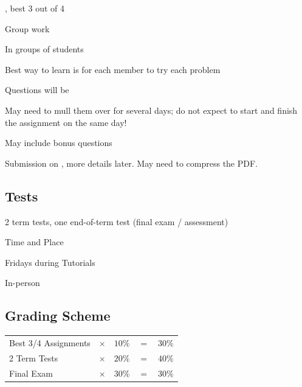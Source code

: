 \begin{listu}
    \item {}, best 3 out of 4
    \item Group work
    \begin{listu}
        \item In groups of  students
        \item Best way to learn is for each member to try each problem
    \end{listu}
    \item Questions will be 
    \begin{listu}
        \item May need to mull them over for several days; do not expect to start and finish the assignment on the same day!
        \item May include bonus questions
    \end{listu}
    \item Submission on , more details later. May need to compress the PDF. 
\end{listu}

\subsection{Tests}

\begin{listu}
    \item 2 term tests, one end-of-term test (final exam / assessment)
    \item Time and Place
    \begin{listu}
        \item Fridays during Tutorials
        \item In-person 
    \end{listu}
\end{listu}

\subsection{Grading Scheme}

\begin{center}
    \begin{tabular}{l c c c c}
        Best 3/4 Assignments & $\times$ & $10\%$ & $=$ & $30\%$ \\
        2 Term Tests         & $\times$ & $20\%$ & $=$ & $40\%$ \\
        Final Exam           & $\times$ & $30\%$ & $=$ & $30\%$ \\
    \end{tabular}
\end{center}


